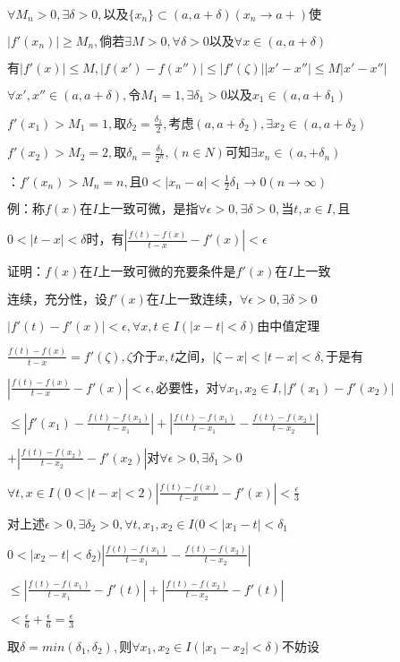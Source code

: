 \documentclass[12pt,a4paper]{article}
\begin{document}
$\forall M_n>0,\exists \delta>0,以及\{x_n\} \subset (a,a+\delta)(x_n \to a+)使$

$|f'(x_n)| \ge M_n,倘若\exists M>0,\forall \delta>0以及\forall x \in (a,a+\delta)$

$有|f'(x)| \le M,|f(x')-f(x'')| \le |f'(\zeta)||x'-x''| \le M|x'-x''|$

$\forall x',x'' \in (a,a+\delta),令M_1=1,\exists \delta_1 >0以及x_1 \in (a,a+\delta_1)$

$f'(x_1)>M_1=1,取\delta_2=\frac{\delta_1}{2},考虑(a,a+\delta_2),\exists x_2 \in (a,a+\delta_2)$

$f'(x_2)>M_2=2,取\delta_n=\frac{\delta_1}{2^n},(n \in N)可知\exists x_n \in (a,+\delta_n)$

$：f'(x_n)>M_n=n,且0<|x_n-a|<\frac{1}{2}\delta_1 \to 0(n \to \infty)$

$例：称f(x)在I上一致可微，是指\forall \epsilon>0,\exists \delta>0,当t,x \in I,且$

$0<|t-x|<\delta 时，有|\frac{f(t)-f(x)}{t-x}-f'(x)|<\epsilon$

$证明：f(x)在I上一致可微的充要条件是f'(x)在I上一致$

$连续，充分性，设f'(x)在I上一致连续，\forall \epsilon >0,\exists \delta >0$

$|f'(t)-f'(x)|<\epsilon,\forall x,t \in I(|x-t|<\delta)由中值定理$

$\frac{f(t)-f(x)}{t-x}=f'(\zeta),\zeta 介于x,t之间，|\zeta-x|<|t-x|<\delta,于是有$

$|\frac{f(t)-f(x)}{t-x}-f'(x)|<\epsilon,必要性，对\forall x_1,x_2 \in I,|f'(x_1)-f'(x_2)|$

$\le |f'(x_1)-\frac{f(t)-f(x_1)}{t-x_1}|+|\frac{f(t)-f(x_1)}{t-x_1}-\frac{f(t)-f(x_2)}{t-x_2}|$

$+|\frac{f(t)-f(x_2)}{t-x_2}-f'(x_2)|对\forall \epsilon >0,\exists \delta_1>0$

$\forall t,x \in I(0<|t-x|<2)|\frac{f(t)-f(x)}{t-x}-f'(x)|<\frac{\epsilon}{3}$

$对上述\epsilon >0,\exists \delta_2>0,\forall t,x_1,x_2 \in I(0<|x_1-t|<\delta_1$

$0<|x_2-t|<\delta_2)|\frac{f(t)-f(x_1)}{t-x_1}-\frac{f(t)-f(x_2)}{t-x_2}|$

$\le |\frac{f(t)-f(x_1)}{t-x_1}-f'(t)|+|\frac{f(t)-f(x_2)}{t-x_2}-f'(t)|$

$< \frac{\epsilon}{6} + \frac{\epsilon}{6} = \frac{\epsilon}{3}$

$取\delta = min(\delta_1,\delta_2),则\forall x_1,x_2 \in I(|x_1-x_2|<\delta)不妨设$
\end{document}
